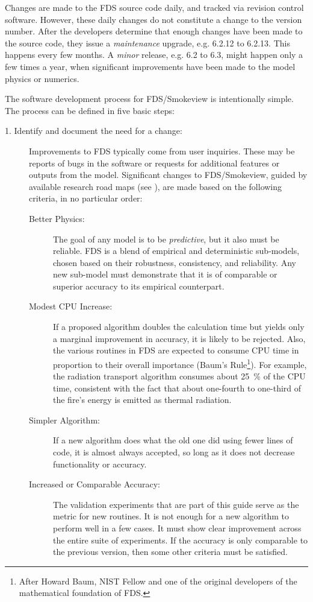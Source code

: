 \documentclass[11pt]{book}
\begin{document}
Changes are made to the FDS source code daily, and tracked via revision control software. However, these daily changes do not constitute a change to the version number. After the developers determine that enough changes have been made to the source code, they issue a {\em maintenance} upgrade, e.g. 6.2.12 to 6.2.13. This happens every few months. A {\em minor} release, e.g. 6.2 to 6.3, might happen only a few times a year, when significant improvements have been made to the model physics or numerics.

The software development process for FDS/Smokeview is intentionally simple. The process can be defined in five basic steps:
\begin{description}
\item [1. Identify and document the need for a change:] Improvements to FDS typically come from user inquiries. These may be reports of bugs in the software or requests for additional features or outputs from the model. Significant changes to FDS/Smokeview, guided by available research road maps \linebreak (see \href{https://pages.nist.gov/fds/} {}), are made based on the following criteria, in no particular order:
\begin{description}
\item[Better Physics:] The goal of any model is to be {\em predictive}, but it also must be reliable. FDS is a blend of empirical and deterministic sub-models, chosen based on their robustness, consistency, and reliability. Any new sub-model must demonstrate that it is of comparable or superior accuracy to its empirical counterpart.
\item[Modest CPU Increase:] If a proposed algorithm doubles the calculation time but yields only a marginal improvement in accuracy, it is likely to be rejected. Also, the various routines in FDS are expected to consume CPU time in proportion to their overall importance (Baum's Rule\footnote{After Howard Baum, NIST Fellow and one of the original developers of the mathematical foundation of FDS.}). For example, the radiation transport algorithm consumes about 25~\% of the CPU time, consistent with the fact that about one-fourth to one-third of the fire's energy is emitted as thermal radiation.
\item[Simpler Algorithm:] If a new algorithm does what the old one did using fewer lines of code, it is almost always accepted, so long as it does not decrease functionality or accuracy.
\item[Increased or Comparable Accuracy:] The validation experiments that are part of this guide serve as the metric for new routines. It is not enough for a new algorithm to perform well in a few cases. It must show clear improvement across the entire suite of experiments. If the accuracy is only comparable to the previous version, then some other criteria must be satisfied.

\end{description}
\end{description}
\end{document}
